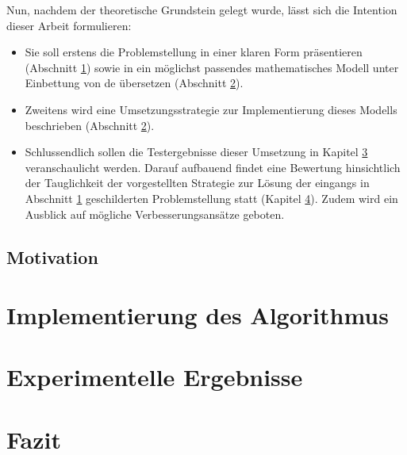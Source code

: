\documentclass[10pt,a4paper,abstraction]{scrreprt}
\begin{document}
	Nun, nachdem der theoretische Grundstein gelegt wurde, lässt sich die Intention dieser Arbeit formulieren:
	\begin{itemize}
		\item Sie soll erstens die Problemstellung in einer klaren Form präsentieren (Abschnitt \ref{sec:motivation}) sowie in ein möglichst passendes mathematisches Modell unter Einbettung von \gls{de} übersetzen (Abschnitt \ref{sec:imp}).
		\item Zweitens wird eine Umsetzungsstrategie zur Implementierung dieses Modells beschrieben (Abschnitt \ref{sec:imp}).
		\item Schlussendlich sollen die Testergebnisse dieser Umsetzung in Kapitel \ref{sec:ex} veranschaulicht werden. Darauf aufbauend findet eine Bewertung hinsichtlich der Tauglichkeit der vorgestellten Strategie zur Lösung der eingangs in Abschnitt \ref{sec:motivation} geschilderten Problemstellung statt (Kapitel \ref{sec:sumary}). Zudem wird ein Ausblick auf mögliche Verbesserungsansätze geboten. 
	\end{itemize}
	
	\newpage
	
	\section{Motivation}
	\label{sec:motivation}
	
	\chapter{Implementierung des Algorithmus}
	\label{sec:imp}
	\chapter{Experimentelle Ergebnisse}
	\label{sec:ex}
	\chapter{Fazit}
	\label{sec:sumary}
	\printglossaries




	
\end{document}
